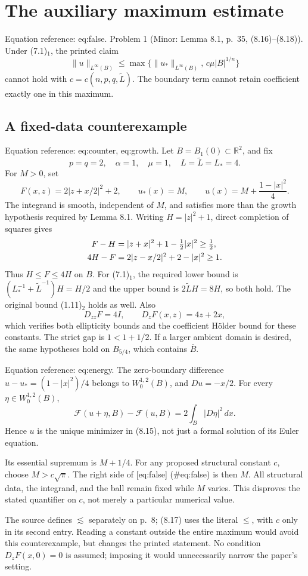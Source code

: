\documentclass[10pt]{article}
\begin{document}
\section*{The auxiliary maximum estimate}
Equation reference: eq:false. Problem 1 (Minor: Lemma 8.1, p. 35, (8.16)–(8.18)).  Under (7.1)\(_1\), the printed claim \[
 \|u\|_{L^\infty(B)}
 \leq\max\{\|u_*\|_{L^\infty(B)},\,c\mu|B|^{1/n}\}\] cannot hold with \(c=c(n,p,q,\widetilde L)\). The boundary term cannot retain coefficient exactly one in this maximum.\par
\subsection*{A fixed-data counterexample}
Equation reference: eq:counter, eq:growth. Let \(B=B_1(0)\subset\mathbb R^2\), and fix \[p=q=2,\quad \alpha=1,\quad \mu=1,\quad
 L=\widetilde L=L_*=4.\] For \(M>0\), set \[
 F(x,z)=2|z+x/2|^2+2,\qquad
 u_*(x)=M,\qquad u(x)=M+\frac{1-|x|^2}{4}.\] The integrand is smooth, independent of \(M\), and satisfies more than the growth hypothesis required by Lemma 8.1. Writing \(H=|z|^2+1\), direct completion of squares gives \[\begin{aligned}

 F-H&=|z+x|^2+1-\tfrac12|x|^2\geq\tfrac12,\\
 4H-F&=2|z-x/2|^2+2-|x|^2\geq1.\notag\end{aligned}\] Thus \(H\leq F\leq4H\) on \(B\). For (7.1)\(_1\), the required lower bound is \((L_*^{-1}+\widetilde L^{-1})H=H/2\) and the upper bound is \(2\widetilde L H=8H\), so both hold. The original bound (1.11)\(_2\) holds as well. Also \[D_{zz}F=4I,\qquad D_zF(x,z)=4z+2x,\] which verifies both ellipticity bounds and the coefficient Hölder bound for these constants. The strict gap is \(1<1+1/2\). If a larger ambient domain is desired, the same hypotheses hold on \(B_{5/4}\), which contains \(\overline B\).\par
Equation reference: eq:energy. The zero-boundary difference \(u-u_*=(1-|x|^2)/4\) belongs to \(W_0^{1,2}(B)\), and \(Du=-x/2\). For every \(\eta\in W_0^{1,2}(B)\), \[
 \mathcal F(u+\eta,B)-\mathcal F(u,B)
 =2\int_B|D\eta|^2\,dx.\] Hence \(u\) is the unique minimizer in (8.15), not just a formal solution of its Euler equation.\par
Its essential supremum is \(M+1/4\). For any proposed structural constant \(c\), choose \(M>c\sqrt{\pi}\). The right side of [eq:false] (\#eq:false) is then \(M\). All structural data, the integrand, and the ball remain fixed while \(M\) varies. This disproves the stated quantifier on \(c\), not merely a particular numerical value.\par
The source defines \(\lesssim\) separately on p. 8; (8.17) uses the literal \(\leq\), with \(c\) only in its second entry. Reading a constant outside the entire maximum would avoid this counterexample, but changes the printed statement. No condition \(D_zF(x,0)=0\) is assumed; imposing it would unnecessarily narrow the paper’s setting.\par
\end{document}
